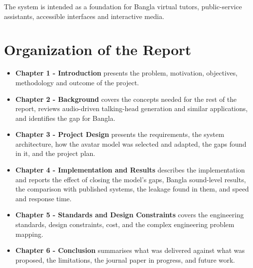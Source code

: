 \noindent
The system is intended as a foundation for Bangla virtual tutors, public-service assistants, accessible interfaces and interactive media.


\section{Organization of the Report}

\begin{itemize}
    \item \textbf{Chapter 1 - Introduction} presents the problem, motivation, objectives, methodology and outcome of the project.

    \item \textbf{Chapter 2 - Background} covers the concepts needed for the rest of the report, reviews audio-driven talking-head generation and similar applications, and identifies the gap for Bangla.

    \item \textbf{Chapter 3 - Project Design} presents the requirements, the system architecture, how the avatar model was selected and adapted, the gaps found in it, and the project plan.

    \item \textbf{Chapter 4 - Implementation and Results} describes the implementation and reports the effect of closing the model's gaps, Bangla sound-level results, the comparison with published systems, the leakage found in them, and speed and response time.

    \item \textbf{Chapter 5 - Standards and Design Constraints} covers the engineering standards, design constraints, cost, and the complex engineering problem mapping.

    \item \textbf{Chapter 6 - Conclusion} summarises what was delivered against what was proposed, the limitations, the journal paper in progress, and future work.
\end{itemize}
